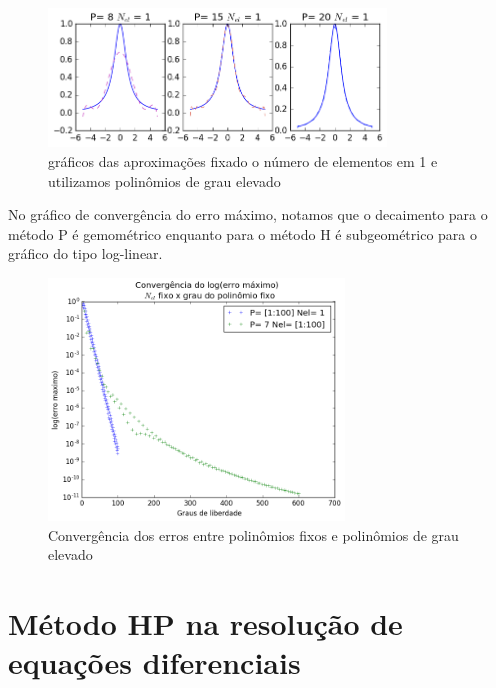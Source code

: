 \begin{figure}[H]
  \includegraphics[width=0.8\textwidth,center]{figuras/interp_usando_FEMfixo.png}
  \caption{gráficos das aproximações fixado o número de elementos em 1 e utilizamos polinômios de grau elevado}
\end{figure}
 No gráfico de convergência do erro máximo, notamos que o decaimento para o método P é gemométrico enquanto para o método H é subgeométrico para o gráfico do tipo log-linear.
 \begin{figure}[H]
  \includegraphics[width=0.7\textwidth,center]{figuras/convergencia_erro_FEM2.png}
  \caption{Convergência dos erros entre polinômios fixos e polinômios de grau elevado}
\end{figure}

\section{Método HP na resolução de equações diferenciais}

